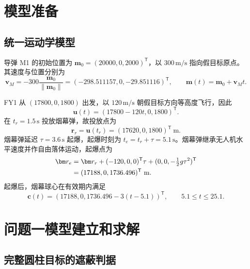 \section{模型准备}

\subsection{统一运动学模型}

导弹 M1 的初始位置为 $\bm m_0=(20000,0,2000)^{\mathsf T}$，以 $300\,\mathrm{m/s}$ 指向假目标原点。其速度与位置分别为
\begin{equation}
    \bm v_M=-300\frac{\bm m_0}{\lVert\bm m_0\rVert}
    =(-298.511157,0,-29.851116)^{\mathsf T},
    \qquad
    \bm m(t)=\bm m_0+\bm v_Mt .
    \label{eq:q1-missile}
\end{equation}

FY1 从 $(17800,0,1800)$ 出发，以 $120\,\mathrm{m/s}$ 朝假目标方向等高度飞行，因此
\begin{equation}
    \bm u(t)=(17800-120t,0,1800)^{\mathsf T}.
    \label{eq:q1-uav}
\end{equation}
在 $t_r=1.5\,\mathrm{s}$ 投放烟幕弹，故投放点为
\begin{equation}
    \bm r_r=\bm u(t_r)=(17620,0,1800)^{\mathsf T}\ \mathrm{m}.
\end{equation}
烟幕弹延迟 $\tau=3.6\,\mathrm{s}$ 起爆，起爆时刻为 $t_e=t_r+\tau=5.1\,\mathrm{s}$。烟幕弹继承无人机水平速度并作自由落体运动，起爆点为
\begin{align}
    \bm r_e
    &=\bm r_r+(-120,0,0)^{\mathsf T}\tau
      +(0,0,-\tfrac12g\tau^2)^{\mathsf T} \notag\\
    &=(17188,0,1736.496)^{\mathsf T}\ \mathrm{m}.
    \label{eq:q1-explosion}
\end{align}
起爆后，烟幕球心在有效期内满足
\begin{equation}
    \bm c(t)=(17188,0,1736.496-3(t-5.1))^{\mathsf T},
    \qquad 5.1\le t\le25.1.
    \label{eq:q1-cloud}
\end{equation}

\section{问题一模型建立和求解}

\subsection{完整圆柱目标的遮蔽判据}

